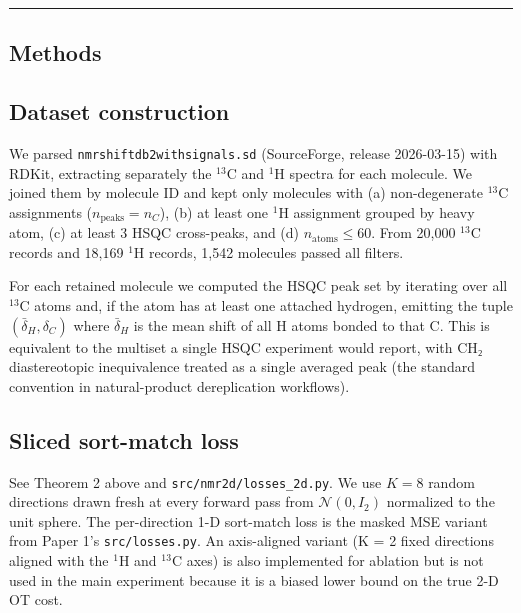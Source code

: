\documentclass[11pt,a4paper]{article}
\begin{document}
\begin{center}\rule{0.5\linewidth}{0.5pt}\end{center}

\subsection{Methods}\label{methods}

\subsection{Dataset construction}\label{dataset-construction}

We parsed \texttt{nmrshiftdb2withsignals.sd} (SourceForge, release 2026-03-15) with RDKit, extracting separately the \(^{13}\)C and \(^{1}\)H spectra for each molecule. We joined them by molecule ID and kept only molecules with (a) non-degenerate \(^{13}\)C assignments (\(n_{\text{peaks}} = n_C\)), (b) at least one \(^{1}\)H assignment grouped by heavy atom, (c) at least 3 HSQC cross-peaks, and (d) \(n_{\text{atoms}} \leq 60\). From 20,000 \(^{13}\)C records and 18,169 \(^{1}\)H records, 1,542 molecules passed all filters.

For each retained molecule we computed the HSQC peak set by iterating over all \(^{13}\)C atoms and, if the atom has at least one attached hydrogen, emitting the tuple \((\bar{\delta}_H, \delta_C)\) where \(\bar{\delta}_H\) is the mean shift of all H atoms bonded to that C. This is equivalent to the multiset a single HSQC experiment would report, with CH₂ diastereotopic inequivalence treated as a single averaged peak (the standard convention in natural-product dereplication workflows).

\subsection{Sliced sort-match loss}\label{sliced-sort-match-loss}

See Theorem 2 above and \texttt{src/nmr2d/losses\_2d.py}. We use \(K = 8\) random directions drawn fresh at every forward pass from \(\mathcal{N}(0, I_2)\) normalized to the unit sphere. The per-direction 1-D sort-match loss is the masked MSE variant from Paper 1's \texttt{src/losses.py}. An axis-aligned variant (K = 2 fixed directions aligned with the \(^{1}\)H and \(^{13}\)C axes) is also implemented for ablation but is not used in the main experiment because it is a biased lower bound on the true 2-D OT cost.
\end{document}
